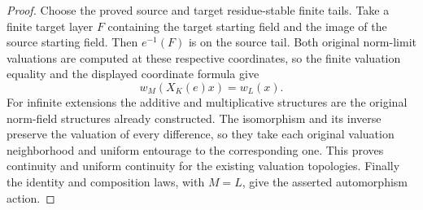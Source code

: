 \begin{proof}
Choose the proved source and target residue-stable finite tails.
Take a finite target layer $F$ containing the target starting field
and the image of the source starting field. Then $e^{-1}(F)$ is on
the source tail. Both original norm-limit valuations are computed
at these respective coordinates, so the finite valuation equality
and the displayed coordinate formula give
\[
 w_M(X_K(e)x)=w_L(x).
\]
For infinite extensions the additive and multiplicative structures
are the original norm-field structures already constructed.
The isomorphism and its inverse preserve the valuation of every
difference, so they take each original valuation neighborhood and
uniform entourage to the corresponding one. This proves continuity
and uniform continuity for the existing valuation topologies.
Finally the identity and composition laws, with $M=L$, give the
asserted automorphism action.
\end{proof}

